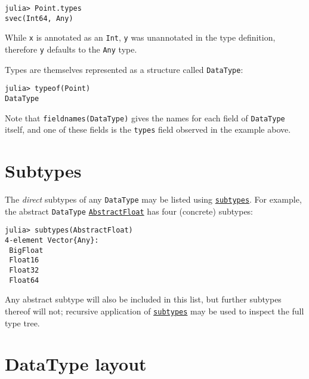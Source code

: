 \begin{verbatim}
julia> Point.types
svec(Int64, Any)
\end{verbatim}



While \texttt{x} is annotated as an \texttt{Int}, \texttt{y} was unannotated in the type definition, therefore \texttt{y} defaults to the \texttt{Any} type.



Types are themselves represented as a structure called \texttt{DataType}:




\begin{verbatim}
julia> typeof(Point)
DataType
\end{verbatim}



Note that \texttt{fieldnames(DataType)} gives the names for each field of \texttt{DataType} itself, and one of these fields is the \texttt{types} field observed in the example above.



\hypertarget{11371291537025953368}{}


\section{Subtypes}



The \emph{direct} subtypes of any \texttt{DataType} may be listed using \hyperlink{13112219412833772146}{\texttt{subtypes}}. For example, the abstract \texttt{DataType} \hyperlink{11465394427882483091}{\texttt{AbstractFloat}} has four (concrete) subtypes:




\begin{verbatim}
julia> subtypes(AbstractFloat)
4-element Vector{Any}:
 BigFloat
 Float16
 Float32
 Float64
\end{verbatim}



Any abstract subtype will also be included in this list, but further subtypes thereof will not; recursive application of \hyperlink{13112219412833772146}{\texttt{subtypes}} may be used to inspect the full type tree.



\hypertarget{11957448814310282424}{}


\section{DataType layout}



